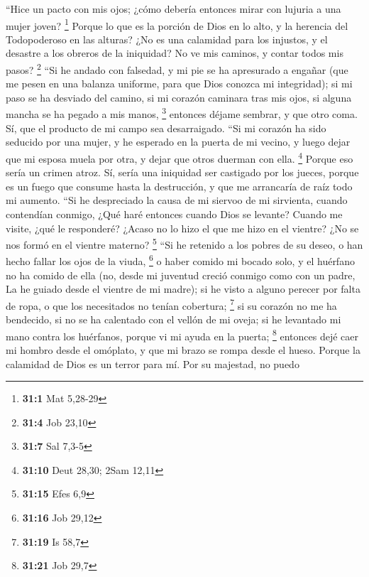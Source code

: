  ``Hice un pacto con mis ojos; ¿cómo debería entonces
mirar con lujuria a una mujer joven? \footnote{\textbf{31:1} Mat 5,28-29}
 Porque lo que es la porción de Dios en lo alto, y la
herencia del Todopoderoso en las alturas?  ¿No es una
calamidad para los injustos, y el desastre a los obreros de la
iniquidad?  No ve mis caminos, y contar todos mis pasos?
\footnote{\textbf{31:4} Job 23,10}  ``Si he andado con
falsedad, y mi pie se ha apresurado a engañar  (que me
pesen en una balanza uniforme, para que Dios conozca mi integridad);
 si mi paso se ha desviado del camino, si mi corazón
caminara tras mis ojos, si alguna mancha se ha pegado a mis manos,
\footnote{\textbf{31:7} Sal 7,3-5}  entonces déjame
sembrar, y que otro coma. Sí, que el producto de mi campo sea
desarraigado.  ``Si mi corazón ha sido seducido por una
mujer, y he esperado en la puerta de mi vecino,  y luego
dejar que mi esposa muela por otra, y dejar que otros duerman con ella.
\footnote{\textbf{31:10} Deut 28,30; 2Sam 12,11}  Porque
eso sería un crimen atroz. Sí, sería una iniquidad ser castigado por los
jueces,  porque es un fuego que consume hasta la
destrucción, y que me arrancaría de raíz todo mi aumento.
 ``Si he despreciado la causa de mi siervoo de mi
sirvienta, cuando contendían conmigo,  ¿Qué haré entonces
cuando Dios se levante? Cuando me visite, ¿qué le responderé?
 ¿Acaso no lo hizo el que me hizo en el vientre? ¿No se
nos formó en el vientre materno? \footnote{\textbf{31:15} Efes 6,9}
 ``Si he retenido a los pobres de su deseo, o han hecho
fallar los ojos de la viuda, \footnote{\textbf{31:16} Job 29,12}
 o haber comido mi bocado solo, y el huérfano no ha
comido de ella  (no, desde mi juventud creció conmigo
como con un padre, La he guiado desde el vientre de mi madre);
 si he visto a alguno perecer por falta de ropa, o que
los necesitados no tenían cobertura; \footnote{\textbf{31:19} Is 58,7}
 si su corazón no me ha bendecido, si no se ha calentado
con el vellón de mi oveja;  si he levantado mi mano
contra los huérfanos, porque vi mi ayuda en la puerta; \footnote{\textbf{31:21}
  Job 29,7}  entonces dejé caer mi hombro desde el
omóplato, y que mi brazo se rompa desde el hueso.  Porque
la calamidad de Dios es un terror para mí. Por su majestad, no puedo

